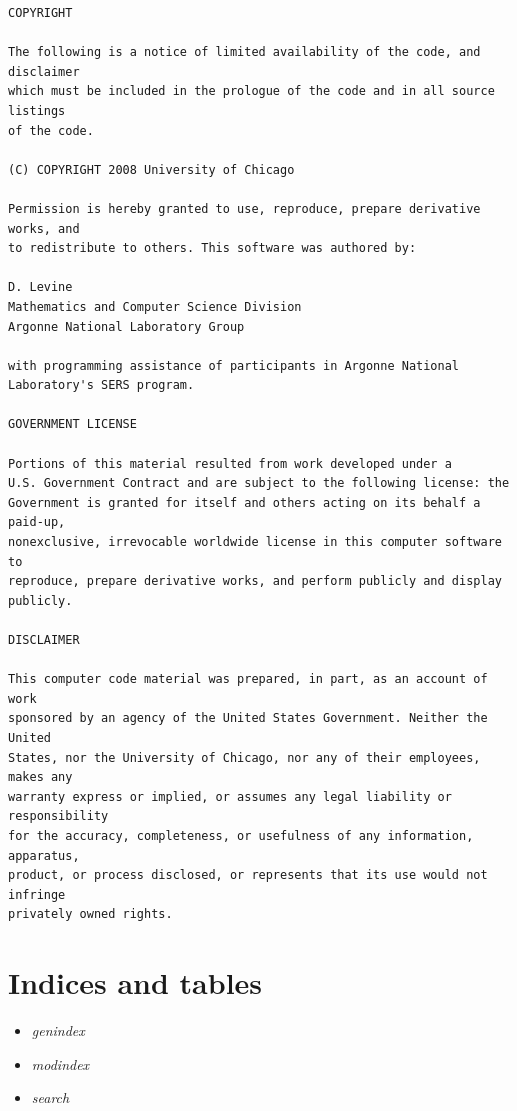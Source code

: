 \documentclass[letterpaper,11pt,english]{sphinxmanual}
\begin{document}
\begin{Verbatim}[commandchars=\\\{\}]
COPYRIGHT

The following is a notice of limited availability of the code, and disclaimer
which must be included in the prologue of the code and in all source listings
of the code.

(C) COPYRIGHT 2008 University of Chicago

Permission is hereby granted to use, reproduce, prepare derivative works, and
to redistribute to others. This software was authored by:

D. Levine
Mathematics and Computer Science Division 
Argonne National Laboratory Group

with programming assistance of participants in Argonne National 
Laboratory's SERS program.

GOVERNMENT LICENSE

Portions of this material resulted from work developed under a
U.S. Government Contract and are subject to the following license: the
Government is granted for itself and others acting on its behalf a paid-up,
nonexclusive, irrevocable worldwide license in this computer software to
reproduce, prepare derivative works, and perform publicly and display
publicly.

DISCLAIMER

This computer code material was prepared, in part, as an account of work
sponsored by an agency of the United States Government. Neither the United
States, nor the University of Chicago, nor any of their employees, makes any
warranty express or implied, or assumes any legal liability or responsibility
for the accuracy, completeness, or usefulness of any information, apparatus,
product, or process disclosed, or represents that its use would not infringe
privately owned rights.
\end{Verbatim}


\chapter{Indices and tables}
\label{index:indices-and-tables}\begin{itemize}
\item {} 
\emph{genindex}

\item {} 
\emph{modindex}

\item {} 
\emph{search}

\end{itemize}



\renewcommand{\indexname}{Index}
\printindex
\end{document}
